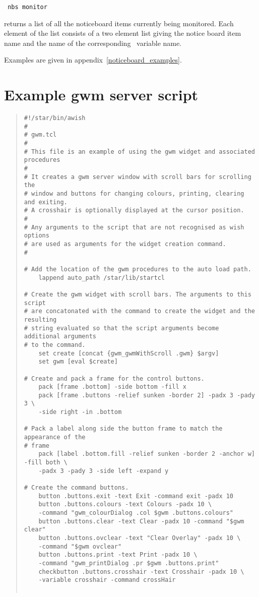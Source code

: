 \begin{tquote}{\tt
nbs monitor
}\end{tquote}
returns a list of all the noticeboard items currently being monitored.
Each element of the list consists of a two element list giving the
notice board item name and the name of the corresponding \Tcl\ variable name.

Examples are given in appendix~\ref{noticeboard_examples}.

\newpage
\appendix
\section{\label{example_gwm_server_script}Example gwm server script}

\begin{small}
\begin{quote}
\begin{verbatim}
#!/star/bin/awish
#
# gwm.tcl
#
# This file is an example of using the gwm widget and associated procedures
#
# It creates a gwm server window with scroll bars for scrolling the
# window and buttons for changing colours, printing, clearing and exiting.
# A crosshair is optionally displayed at the cursor position.
#
# Any arguments to the script that are not recognised as wish options
# are used as arguments for the widget creation command.
#

# Add the location of the gwm procedures to the auto load path.
    lappend auto_path /star/lib/startcl

# Create the gwm widget with scroll bars. The arguments to this script
# are concatonated with the command to create the widget and the resulting
# string evaluated so that the script arguments become additional arguments
# to the command.
    set create [concat {gwm_gwmWithScroll .gwm} $argv]
    set gwm [eval $create]

# Create and pack a frame for the control buttons.
    pack [frame .bottom] -side bottom -fill x
    pack [frame .buttons -relief sunken -border 2] -padx 3 -pady 3 \
	-side right -in .bottom

# Pack a label along side the button frame to match the appearance of the
# frame
    pack [label .bottom.fill -relief sunken -border 2 -anchor w] -fill both \
	-padx 3 -pady 3 -side left -expand y

# Create the command buttons.
    button .buttons.exit -text Exit -command exit -padx 10
    button .buttons.colours -text Colours -padx 10 \
	-command "gwm_colourDialog .col $gwm .buttons.colours"
    button .buttons.clear -text Clear -padx 10 -command "$gwm clear"
    button .buttons.ovclear -text "Clear Overlay" -padx 10 \
	-command "$gwm ovclear"
    button .buttons.print -text Print -padx 10 \
	-command "gwm_printDialog .pr $gwm .buttons.print"
    checkbutton .buttons.crosshair -text Crosshair -padx 10 \
	-variable crosshair -command crossHair


\end{verbatim}
\end{quote}
\end{small}
